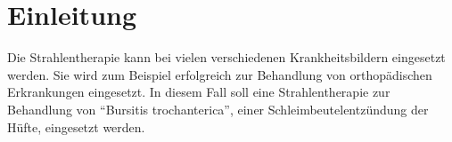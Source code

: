 \section{Einleitung}
\label{sec:Einleitung}

Die Strahlentherapie kann bei vielen verschiedenen Krankheitsbildern eingesetzt werden.
Sie wird zum Beispiel erfolgreich zur Behandlung von orthopädischen Erkrankungen eingesetzt.
In diesem Fall soll eine Strahlentherapie zur Behandlung von \enquote{Bursitis trochanterica}, einer
Schleimbeutelentzündung der Hüfte, eingesetzt werden.
